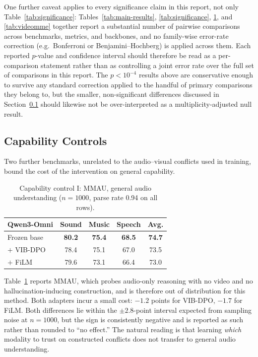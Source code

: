 \documentclass[11pt,a4paper,oneside]{article}
\begin{document}
One further caveat applies to every significance claim in this report, not only
Table~\ref{tab:significance}: Tables~\ref{tab:main-results}, \ref{tab:significance},
\ref{tab:mmau}, and \ref{tab:videomme} together report a substantial number of pairwise comparisons across
benchmarks, metrics, and backbones, and no family-wise error-rate correction (e.g.\ Bonferroni or
Benjamini--Hochberg) is applied across them. Each reported $p$-value and confidence interval should
therefore be read as a per-comparison statement rather than as controlling a joint error rate over
the full set of comparisons in this report. The $p<10^{-4}$ results above are conservative enough to
survive any standard correction applied to the handful of primary comparisons they belong to, but the
smaller, non-significant differences discussed in Section~\ref{sec:capability} should likewise not be
over-interpreted as a multiplicity-adjusted null result.

\subsection{Capability Controls}
\label{sec:capability}

Two further benchmarks, unrelated to the audio--visual conflicts used in training, bound the cost of
the intervention on general capability.

\begin{table}[h]
\centering
\small
\begin{tabular}{lcccc}
\toprule
Qwen3-Omni & Sound & Music & Speech & Avg. \\
\midrule
Frozen base    & \textbf{80.2} & \textbf{75.4} & \textbf{68.5} & \textbf{74.7} \\
$+$ VIB-DPO   & 78.4 & 75.1 & 67.0 & 73.5 \\
$+$ FiLM       & 79.6 & 73.1 & 66.4 & 73.0 \\
\bottomrule
\end{tabular}
\caption{Capability control I: MMAU, general audio understanding ($n=1000$, parse rate 0.94 on all
rows).}
\label{tab:mmau}
\end{table}

Table~\ref{tab:mmau} reports MMAU, which probes audio-only reasoning with no video and no
hallucination-inducing construction, and is therefore out of distribution for this method. Both
adapters incur a small cost: $-1.2$ points for VIB-DPO, $-1.7$ for FiLM. Both differences lie within
the $\pm2.8$-point interval expected from sampling noise at $n=1000$, but the sign is consistently
negative and is reported as such rather than rounded to ``no effect.'' The natural reading is that
learning \emph{which} modality to trust on constructed conflicts does not transfer to general audio
understanding.
\end{document}
